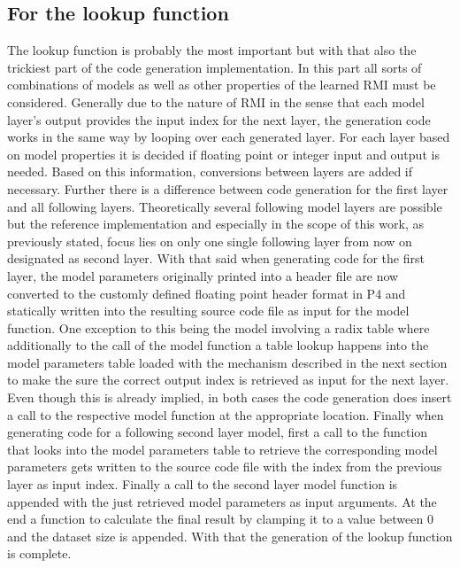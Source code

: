 \subsection{For the lookup function}
\label{sect:rmiforp4:lookup}
The lookup function is probably the most important but with that also the trickiest part of the code generation implementation. In this part all sorts of combinations of models as well as other properties of the learned RMI must be considered. Generally due to the nature of RMI in the sense that each model layer's output provides the input index for the next layer, the generation code works in the same way by looping over each generated layer. For each layer based on model properties it is decided if floating point or integer input and output is needed. Based on this information, conversions between layers are added if necessary. Further there is a difference between code generation for the first layer and all following layers. Theoretically several following model layers are possible but the reference implementation and especially in the scope of this work, as previously stated, focus lies on only one single following layer from now on designated as second layer. With that said when generating code for the first layer, the model parameters originally printed into a header file are now converted to the customly defined floating point header format in P4 and statically written into the resulting source code file as input for the model function. One exception to this being the model involving a radix table where additionally to the call of the model function a table lookup happens into the model parameters table loaded with the mechanism described in the next section to make the sure the correct output index is retrieved as input for the next layer. Even though this is already implied, in both cases the code generation does insert a call to the respective model function at the appropriate location. Finally when generating code for a following second layer model, first a call to the function that looks into the model parameters table to retrieve the corresponding model parameters gets written to the source code file with the index from the previous layer as input index. Finally a call to the second layer model function is appended with the just retrieved model parameters as input arguments. At the end a function to calculate the final result by clamping it to a value between 0 and the dataset size is appended. With that the generation of the lookup function is complete.

